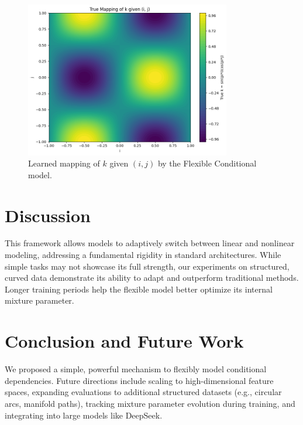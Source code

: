 \documentclass[11pt]{article}
\begin{document}
\begin{figure}[h]
\centering
\includegraphics[width=0.8\textwidth]{figures/example_contour.png}
\caption{Learned mapping of $k$ given $(i, j)$ by the Flexible Conditional model.}
\label{fig:contour}
\end{figure}

\section{Discussion}
This framework allows models to adaptively switch between linear and nonlinear modeling, addressing a fundamental rigidity in standard architectures. While simple tasks may not showcase its full strength, our experiments on structured, curved data demonstrate its ability to adapt and outperform traditional methods. Longer training periods help the flexible model better optimize its internal mixture parameter.

\section{Conclusion and Future Work}
We proposed a simple, powerful mechanism to flexibly model conditional dependencies. Future directions include scaling to high-dimensional feature spaces, expanding evaluations to additional structured datasets (e.g., circular arcs, manifold paths), tracking mixture parameter evolution during training, and integrating into large models like DeepSeek.



\end{document}
